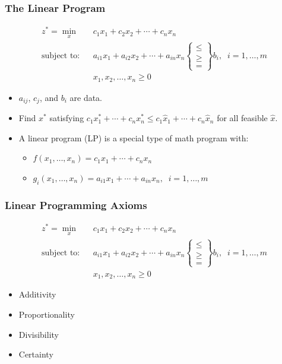 \documentclass[12pt,handout]{beamer}
\begin{document}
\begin{frame}
\frametitle{The Linear Program}
\begin{eqnarray}
z^* = \min_x && c_1 x_1 + c_2 x_2 + \cdots + c_n x_n \nonumber \\
\mbox{subject to:} &&a_{i1} x_1 + a_{i2} x_2 + \cdots + a_{in} x_n
\begin{Bmatrix}   \le \\
                   \ge \\
                    =
\end{Bmatrix}
b_i,\;\;i = 1,\ldots,m \nonumber \\
&&x_1, x_2, \ldots, x_n \ge 0 \nonumber
\end{eqnarray}
\begin{itemize}
\item $a_{ij}$, $c_j$, and $b_i$ are data.
\item Find $x^*$ satisfying $c_1 x_1^* + \cdots + c_n x_n^* \le c_1 \hat{x}_1 + \cdots + c_n \hat{x}_n$ for all feasible $\hat{x}$.
\item A linear program (LP) is a special type of math program with:
    \begin{itemize}
    \item $f(x_1,\ldots,x_n) = c_1 x_1 + \cdots + c_n x_n$
    \item $g_i(x_1,\ldots,x_n) = a_{i1} x_1 + \cdots + a_{in} x_n,\;\;i = 1,\ldots,m$
    \end{itemize}
\end{itemize}
\end{frame}

\begin{frame}
\frametitle{Linear Programming Axioms}
\begin{eqnarray}
z^* = \min_x && c_1 x_1 + c_2 x_2 + \cdots + c_n x_n \nonumber \\
\mbox{subject to:} &&a_{i1} x_1 + a_{i2} x_2 + \cdots + a_{in} x_n
\begin{Bmatrix}   \le \\
                   \ge \\
                    =
\end{Bmatrix}
b_i,\;\;i = 1,\ldots,m \nonumber \\
&&x_1, x_2, \ldots, x_n \ge 0 \nonumber
\end{eqnarray}
\begin{itemize}
\item Additivity
\item Proportionality
\item Divisibility
\item Certainty
\end{itemize}
\end{frame}
\end{document}
